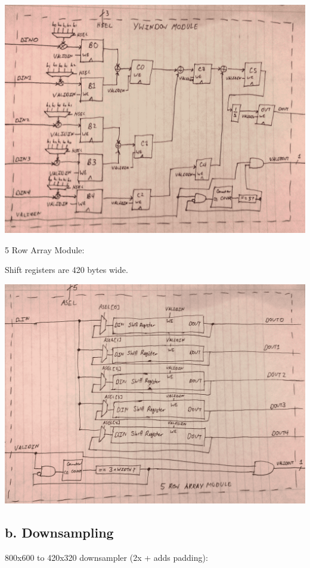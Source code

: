 \documentclass[11pt]{article}
\begin{document}
\noindent\includegraphics[width=\textwidth]{modules/procy_window.png}

\newpage

5 Row Array Module:

Shift registers are 420 bytes wide.

\noindent\includegraphics[width=\textwidth]{modules/proc5row.png}

\newpage

\subsection*{b. Downsampling}

800x600 to 420x320 downsampler (2x + adds padding):
\end{document}
